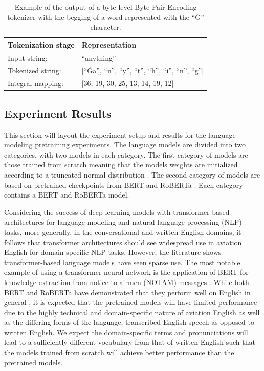 \documentclass[12pt]{article}
\begin{document}
\begin{table}[!t]
    \centering
    \begin{tabular}{l l}
        \toprule
        Tokenization stage & Representation                                            \\
        \midrule
        Input string:      & ``anything''                                              \\
        Tokenized string:  & [``Ġa'', ``n'', ``y'', ``t'', ``h'', ``i'', ``n'', ``g''] \\
        Integral mapping:  & [36, 19, 30, 25, 13, 14, 19, 12]                          \\
        \bottomrule
    \end{tabular}
    \caption{Example of the output of a byte-level Byte-Pair Encoding tokenizer with the begging of a word represented with the ``Ġ'' character.}
    \label{tab:byte_level_bpe_example}
\end{table}

\subsection{Experiment Results}
This section will layout the experiment setup and results for the language modeling pretraining experiments. The language models are divided into two
categories, with two models in each category. The first category of models are those trained from scratch meaning that the models weights are
initialized according to a truncated normal distribution \cite{burkardt_truncated_2014}. The second category of models are based on pretrained
checkpoints from BERT and RoBERTa \cite{devlin_bert_2019,liu_roberta_2019}. Each category contains a BERT and RoBERTa model.

Considering the success of deep learning models with transformer-based architectures for language modeling and natural language processing (NLP)
tasks, more generally, in the conversational and written English domains, it follows that transformer architectures should see widespread use in
aviation English for domain-specific NLP tasks. However, the literature shows transformer-based language models have seen sparse use. The most notable
example of using a transformer neural network is the application of BERT for knowledge extraction from notice to airmen (NOTAM) messages
\cite{arnold_knowledge_2022}. While both BERT and RoBERTa have demonstrated that they perform well on English in general
\cite{devlin_bert_2019,liu_roberta_2019}, it is expected that the pretrained models will have limited performance due to the highly technical and
domain-specific nature of aviation English as well as the differing forms of the language; transcribed English speech as opposed to written English.
We expect the domain-specific terms and pronunciations will lead to a sufficiently different vocabulary from that of written English such that the
models trained from scratch will achieve better performance than the pretrained models.
\end{document}
